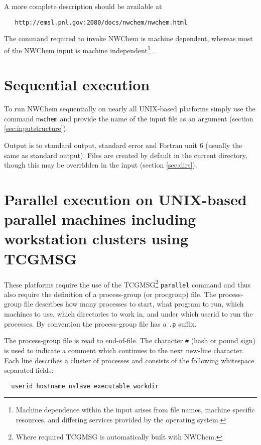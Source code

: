 A more complete description should be available at 
\begin{verbatim}
   http://emsl.pnl.gov:2080/docs/nwchem/nwchem.html
\end{verbatim}

The command required to invoke NWChem is machine dependent, whereas
most of the NWChem input is machine independent\footnote{Machine
dependence within the input arises from file names, machine
specific resources, and differing services provided by the operating system.} .

\section{Sequential execution}

To run NWChem sequentially on nearly all UNIX-based platforms simply
use the command \verb+nwchem+ and provide the name of the input file
as an argument (section \ref{sec:inputstructure}).

Output is to standard output, standard error and Fortran unit 6
(usually the same as standard output).  Files are created by default
in the current directory, though this may be overridden in the input
(section \ref{sec:dirs}).

\section{Parallel execution on UNIX-based parallel machines
including workstation clusters using TCGMSG}
\label{sec:procgrp}

 These platforms require the use of the TCGMSG\footnote{Where required
TCGMSG is automatically built with NWChem.} \verb+parallel+ command
and thus also require the definition of a process-group (or procgroup)
file.  The process-group file describes how many processes to start,
what program to run, which machines to use, which directories to work
in, and under which userid to run the processes.  By convention the
process-group file has a \verb+.p+ suffix.

The process-group file is read to end-of-file.  The character \verb+#+
(hash or pound sign) is used to indicate a comment which continues to
the next new-line character.  Each line describes a cluster of
processes and consists of the following whitespace separated fields:

\begin{verbatim}
  userid hostname nslave executable workdir
\end{verbatim}

